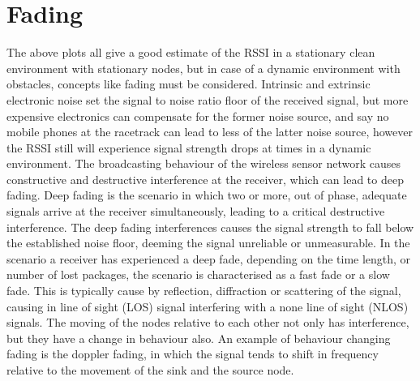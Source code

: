 \section{Fading}\label{sc:fading}
The above plots all give a good estimate of the RSSI in a stationary clean environment with stationary nodes, but in case of a dynamic environment with obstacles, concepts like fading must be considered. Intrinsic and extrinsic electronic noise set the signal to noise ratio floor of the received signal, but more expensive electronics can compensate for the former noise source, and say no mobile phones at the racetrack can lead to less of the latter noise source, however the RSSI still will experience signal strength drops at times in a dynamic environment. The broadcasting behaviour of the wireless sensor network causes constructive and destructive interference at the receiver, which can lead to deep fading. Deep fading is the scenario in which two or more, out of phase, adequate signals arrive at the receiver simultaneously, leading to a critical destructive interference. The deep fading interferences causes the signal strength to fall below the established noise floor, deeming the signal unreliable or unmeasurable. In the scenario a receiver has experienced a deep fade, depending on the time length, or number of lost packages, the scenario is characterised as a fast fade or a slow fade. This is typically cause by reflection, diffraction or scattering of the signal, causing in line of sight (LOS) signal interfering with a none line of sight (NLOS) signals. The moving of the nodes relative to each other not only has interference, but they have a change in behaviour also. An example of behaviour changing fading is the doppler fading, in which the signal tends to shift in frequency relative to the movement of the sink and the source node. 

